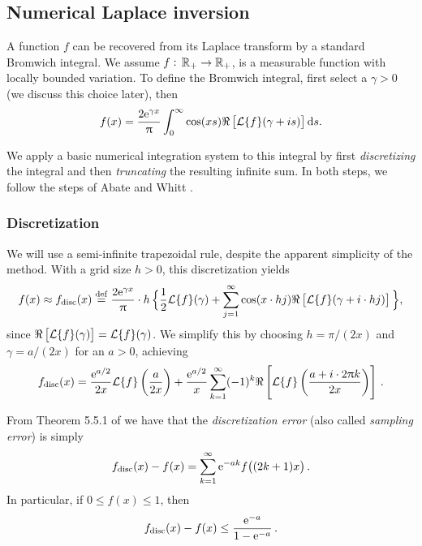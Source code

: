 \subsection{Numerical Laplace inversion}

A function $f$ can be recovered from its Laplace transform by a standard Bromwich integral.
We assume $f:\,\mathbb{R}_+ \to \mathbb{R}_+$, is a measurable function with locally bounded variation.
To define the Bromwich integral, first select a $\gamma > 0$ (we discuss this choice later), then
\[
f(x)=\frac{2\mathrm{e}^{\gamma x}}{\uppi}\int_{0}^{\infty}\cos(xs)\Re\left[\mathcal{L}\{f\}(\gamma + is)\right]\mathrm{d} s.
\]

We apply a basic numerical integration system to this integral by first \emph{discretizing} the integral and then \emph{truncating} the resulting infinite sum. In both steps, we follow the steps of Abate and Whitt \cite{AbWh92}.

\subsubsection{Discretization} \label{Sub:Discretization}

We will use a semi-infinite trapezoidal rule, despite the apparent simplicity of the method.
With a grid size $h>0$, this discretization yields
\[
f(x) \approx f_{\text{disc}}(x) \overset{\mathrm{def}}{=} \frac{2\mathrm{e}^{\gamma x}}{\uppi} \cdot h \, \Big \{ \frac12 \mathcal{L}\{f\}(\gamma) + \sum_{j=1}^\infty  \cos(x \cdot hj)\Re\left[\mathcal{L}\{f\}(\gamma + i \cdot hj)\right] \Big \},
\]
since  $\Re\left[\mathcal{L}\{f\}(\gamma)\right] = \mathcal{L}\{f\}(\gamma)$. We simplify this by choosing $h = \pi/(2 x)$ and $\gamma = a / (2 x)$ for an $a > 0$, achieving
\begin{equation} \label{DiscretizedInversion}
f_{\text{disc}}(x) = \frac{\mathrm{e}^{a/2}}{2x}\mathcal{L}\{f\} \left(\frac{a}{2 x}\right) + \frac{\mathrm{e}^{a/2}}{x} \sum_{k=1}^\infty (-1)^{k} \Re\left[\mathcal{L}\{f\}\left(\frac{a+ i \cdot 2\uppi k}{2 x}\right)\right] \,.
\end{equation}

From Theorem 5.5.1 of \cite{RoScScTe99} we have that the \emph{discretization error} (also called \emph{sampling error}) is simply
\begin{equation} \label{DiscretizationError}
    f_{\text{disc}}(x) - f(x) = \sum_{k=1}^\infty \mathrm{e}^{-a k} f\big( (2k+1) x \big) \,.
\end{equation}
In particular, if $0 \le f(x) \le 1$, then
\begin{equation} \label{BoundedDiscretizationError}
    f_{\text{disc}}(x) - f(x) \le \frac{\mathrm{e}^{-a}}{1-\mathrm{e}^{-a}} \,.
\end{equation}

